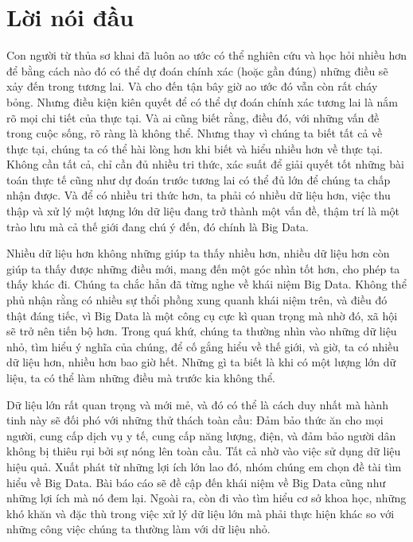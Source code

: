 \documentclass[12pt]{report}
\begin{document}

\newpage
\setcounter{page}{1}
\tableofcontents
\newpage
\chapter*{Lời nói đầu}
Con người từ thủa sơ khai đã luôn ao ước có thể nghiên cứu và học hỏi nhiều hơn để bằng cách nào đó có thể dự đoán chính xác (hoặc gần đúng) những điều sẽ xảy đến trong tương lai. Và cho đến tận bây giờ ao ước đó vẫn còn rất cháy bỏng. Nhưng điều kiện kiên quyết để có thể dự đoán chính xác tương lai là nắm rõ mọi chi tiết của thực tại. Và ai cũng biết rằng, điều đó, với những vấn đề trong cuộc sống, rõ ràng là không thể. Nhưng thay vì chúng ta biết tất cả về thực tại, chúng ta có thể hài lòng hơn khi biết và hiểu nhiều hơn về thực tại. Không cần tất cả, chỉ cần đủ nhiều tri thức, xác suất để giải quyết tốt những bài toán thực tế cũng như dự đoán trước tương lai có thể đủ lớn để chúng ta chấp nhận được. Và để có nhiều tri thức hơn, ta phải có nhiều dữ liệu hơn, việc thu thập và xử lý một lượng lớn dữ liệu đang trở thành một vấn đề, thậm trí là một trào lưu mà cả thế giới đang chú ý đến, đó chính là Big Data. 

Nhiều dữ liệu hơn không những giúp ta thấy nhiều hơn, nhiều dữ liệu hơn còn giúp ta thấy được những điều mới, mang đến một góc nhìn tốt hơn, cho phép ta thấy khác đi. Chúng ta chắc hẳn đã từng nghe về khái niệm Big Data. Không thể phủ nhận rằng có nhiều sự thổi phồng xung quanh khái niệm trên, và điều đó thật đáng tiếc, vì Big Data là một công cụ cực kì quan trọng mà nhờ đó, xã hội sẽ trở nên tiến bộ hơn. Trong quá khứ, chúng ta thường nhìn vào những dữ liệu nhỏ, tìm hiểu ý nghĩa của chúng, để cố gắng hiểu về thế giới, và giờ, ta có nhiều dữ liệu hơn, nhiều hơn bao giờ hết. Những gì ta biết là khi có một lượng lớn dữ liệu, ta có thể làm những điều mà trước kia không thể. 

Dữ liệu lớn rất quan trọng và mới mẻ, và đó có thể là cách duy nhất mà hành tinh này sẽ đối phó với những thử thách toàn cầu: Đảm bảo thức ăn cho mọi người, cung cấp dịch vụ y tế, cung cấp năng lượng, điện, và đảm bảo người dân không bị thiêu rụi bởi sự nóng lên toàn cầu. Tất cả nhờ vào việc sử dụng dữ liệu hiệu quả. Xuất phát từ những lợi ích lớn lao đó, nhóm chúng em chọn đề tài tìm hiểu về Big Data.
Bài báo cáo sẽ đề cập đến khái niệm về Big Data cũng như những lợi ích mà nó đem lại. Ngoài ra, còn đi vào tìm hiểu cơ sở khoa học, những khó khăn và đặc thù trong việc xử lý dữ liệu lớn mà phải thực hiện khác so với những công việc chúng ta thường làm với dữ liệu nhỏ.
\end{document}
